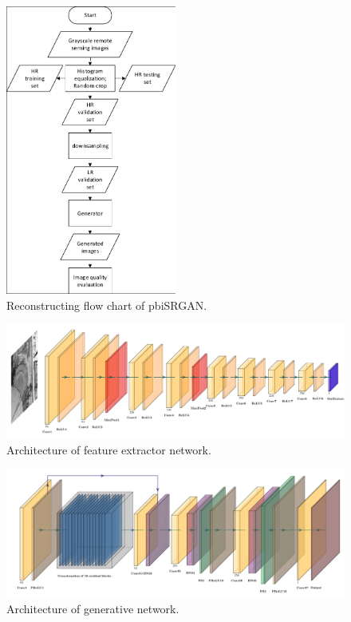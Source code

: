 \documentclass[10pt,twocolumn,letterpaper]{article}
\begin{document}
 \begin{figure}
\begin{center}
\includegraphics[width=0.5\textwidth]{fig2}
\end{center}
   \caption{Reconstructing flow chart of pbiSRGAN.}
\label{fig2}
\end{figure}

 \begin{figure}
\begin{center}
\includegraphics[width=1\textwidth]{fig3}
\end{center}
   \caption{Architecture of feature extractor network.}
\label{fig3}
\end{figure}

 \begin{figure}
\begin{center}
\includegraphics[width=1\textwidth]{fig4}
\end{center}
   \caption{Architecture of generative network.}
\label{fig4}
\end{figure}
\end{document}

